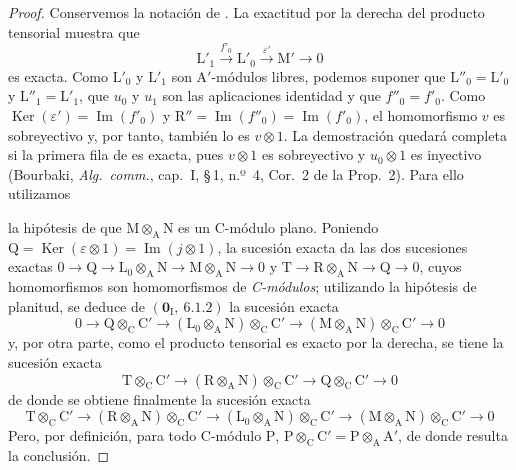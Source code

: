 \begin{proof}
Conservemos la notación de . La exactitud por la derecha del producto
tensorial muestra que
\[
  \mathrm{L}'_1\xrightarrow{f'_0}\mathrm{L}'_0
  \xrightarrow{\varepsilon'}\mathrm{M}'\longrightarrow0
\]
es exacta. Como $\mathrm{L}'_0$ y $\mathrm{L}'_1$ son
$\mathrm{A}'$-módulos libres, podemos suponer que
$\mathrm{L}''_0=\mathrm{L}'_0$ y
$\mathrm{L}''_1=\mathrm{L}'_1$, que $u_0$ y $u_1$ son las aplicaciones
identidad y que $f''_0=f'_0$. Como
$\operatorname{Ker}(\varepsilon')=\operatorname{Im}(f'_0)$ y
$\mathrm{R}''=\operatorname{Im}(f''_0)=\operatorname{Im}(f'_0)$, el
homomorfismo $v$ es sobreyectivo y, por tanto, también lo es $v\otimes1$. La demostración
quedará completa si la primera fila de
 es exacta, pues $v\otimes1$ es
sobreyectivo y $u_0\otimes1$ es inyectivo (Bourbaki,
\emph{Alg.\ comm.}, cap.~I, \S\,1, n.º~4, Cor.~2 de la Prop.~2). Para ello
utilizamos


la hipótesis de que $\mathrm{M}\otimes_\mathrm{A}\mathrm{N}$ es un C-módulo plano. Poniendo $\mathrm{Q}=\operatorname{Ker}(\varepsilon\otimes 1)=\operatorname{Im}(j\otimes 1)$, la sucesión exacta  da las dos sucesiones exactas $0\to\mathrm{Q}\to\mathrm{L}_0\otimes_\mathrm{A}\mathrm{N}\to\mathrm{M}\otimes_\mathrm{A}\mathrm{N}\to 0$ y $\mathrm{T}\to\mathrm{R}\otimes_\mathrm{A}\mathrm{N}\to\mathrm{Q}\to 0$, cuyos homomorfismos son homomorfismos de \emph{C-módulos}; utilizando la hipótesis de planitud, se deduce de $(\mathbf{0}_\mathrm{I},~6.1.2)$ la sucesión exacta
\[
  0\to\mathrm{Q}\otimes_\mathrm{C}\mathrm{C}'\to(\mathrm{L}_0\otimes_\mathrm{A}\mathrm{N})\otimes_\mathrm{C}\mathrm{C}'\to(\mathrm{M}\otimes_\mathrm{A}\mathrm{N})\otimes_\mathrm{C}\mathrm{C}'\to 0
\]
y, por otra parte, como el producto tensorial es exacto por la derecha, se tiene la sucesión exacta
\[
  \mathrm{T}\otimes_\mathrm{C}\mathrm{C}'\to(\mathrm{R}\otimes_\mathrm{A}\mathrm{N})\otimes_\mathrm{C}\mathrm{C}'\to\mathrm{Q}\otimes_\mathrm{C}\mathrm{C}'\to 0
\]
de donde se obtiene finalmente la sucesión exacta
\[
  \mathrm{T}\otimes_\mathrm{C}\mathrm{C}'\to(\mathrm{R}\otimes_\mathrm{A}\mathrm{N})\otimes_\mathrm{C}\mathrm{C}'\to(\mathrm{L}_0\otimes_\mathrm{A}\mathrm{N})\otimes_\mathrm{C}\mathrm{C}'\to(\mathrm{M}\otimes_\mathrm{A}\mathrm{N})\otimes_\mathrm{C}\mathrm{C}'\to 0
\]
Pero, por definición, para todo C-módulo $\mathrm{P}$, $\mathrm{P}\otimes_\mathrm{C}\mathrm{C}'=\mathrm{P}\otimes_\mathrm{A}\mathrm{A}'$, de donde resulta la conclusión.
\end{proof}

